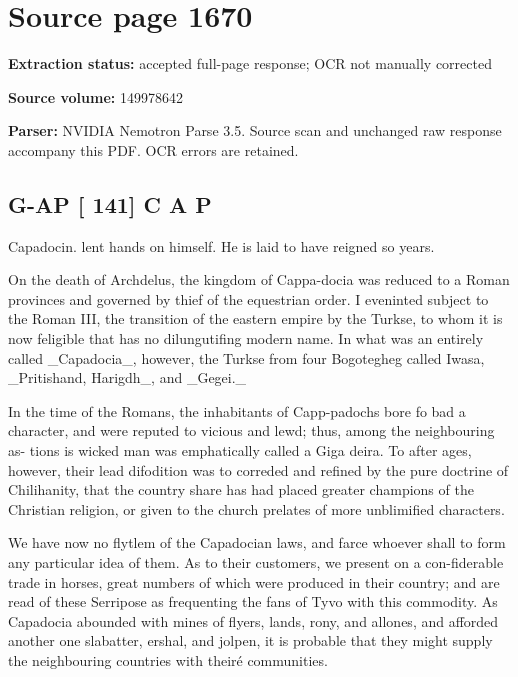\clearpage
\section{Source page 1670}
\textbf{Extraction status:} accepted full-page response; OCR not manually corrected\par
\textbf{Source volume:} 149978642\par
\textbf{Parser:} NVIDIA Nemotron Parse 3.5. Source scan and unchanged raw response accompany this PDF. OCR errors are retained.\par\medskip
\subsection*{G-AP [ 141] C A P}
Capadocin. lent hands on himself. He is laid to have reigned so years.\par\medskip
On the death of Archdelus, the kingdom of Cappa-docia was reduced to a Roman provinces and governed by thief of the equestrian order. I eveninted subject to the Roman III, the transition of the eastern empire by the Turkse, to whom it is now feligible that has no dilungutifing modern name. In what was an entirely called \_Capadocia\_, however, the Turkse from four Bogotegheg called Iwasa, \_Pritishand, Harigdh\_, and \_Gegei.\_\par\medskip
In the time of the Romans, the inhabitants of Capp-padochs bore fo bad a character, and were reputed to vicious and lewd; thus, among the neighbouring as- tions is wicked man was emphatically called a Giga deira. To after ages, however, their lead difodition was to correded and refined by the pure doctrine of Chilihanity, that the country share has had placed greater champions of the Christian religion, or given to the church prelates of more unblimified characters.\par\medskip
We have now no flytlem of the Capadocian laws, and farce whoever shall to form any particular idea of them. As to their customers, we present on a con-fiderable trade in horses, great numbers of which were produced in their country; and are read of these Serripose as frequenting the fans of Tyvo with this commodity. As Capadocia abounded with mines of flyers, lands, rony, and allones, and afforded another one slabatter, ershal, and jolpen, it is probable that they might supply the neighbouring countries with theiré communities.\par\medskip
